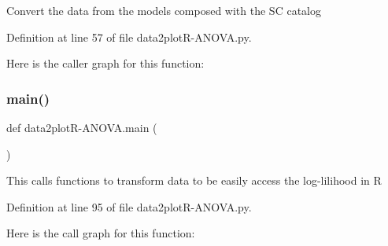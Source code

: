 \begin{DoxyVerb}Convert the data from the models composed with the SC catalog
\end{DoxyVerb}
 

Definition at line 57 of file data2plot\+R-\/\+A\+N\+O\+V\+A.\+py.

Here is the caller graph for this function\+:
\mbox{\label{namespacedata2plot_r-_a_n_o_v_a_ab3d02ce013a6854a4157d2b785dd4039}} 
\subsubsection{\texorpdfstring{main()}{main()}}
{\footnotesize\ttfamily def data2plotR-\/A\+N\+O\+V\+A.\+main (\begin{DoxyParamCaption}{ }\end{DoxyParamCaption})}

\begin{DoxyVerb}This calls functions to transform data to be easily access the log-lilihood in R
\end{DoxyVerb}
 

Definition at line 95 of file data2plot\+R-\/\+A\+N\+O\+V\+A.\+py.

Here is the call graph for this function\+:
